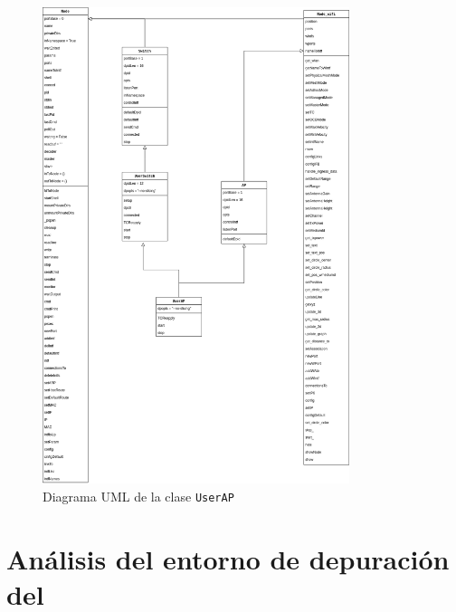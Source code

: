 \begin{figure}[ht]
    \centering
    \includegraphics[width=0.8\textwidth]{archivos/img/analisis/userAP.png}
    \caption{Diagrama UML de la clase \texttt{UserAP} \cite{carrascal2023comprehensive}}
    \label{fig:userAP}
\end{figure}

\section{Análisis del entorno de depuración del }
\label{sec:ana_gdb}


